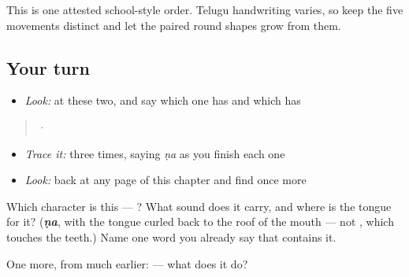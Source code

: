 This is one attested school-style order. Telugu handwriting varies, so keep the five movements distinct and let the paired round shapes grow from them.

\subsection*{Your turn}
\begin{itemize}
\raggedright
  \item \emph{Look:} at these two, and say which one has  and which has 
\end{itemize}

\begin{quote}
  ·  
\end{quote}

\begin{itemize}
\raggedright
  \item \emph{Trace it:}  three times, saying \emph{ṇa} as you finish each one
  \item \emph{Look:} back at any page of this chapter and find  once more
\end{itemize}

\begin{tcolorbox}[breakable,colback=teal!4,colframe=teal!35!black,title={Before you move on}]
Which character is this — ? What sound does it carry, and where is the tongue for it? (\emph{\textbf{ṇa}}, with the tongue curled back to the roof of the mouth — not , which touches the teeth.) Name one word you already say that contains it.

One more, from much earlier:  — what does it do?
\end{tcolorbox}
